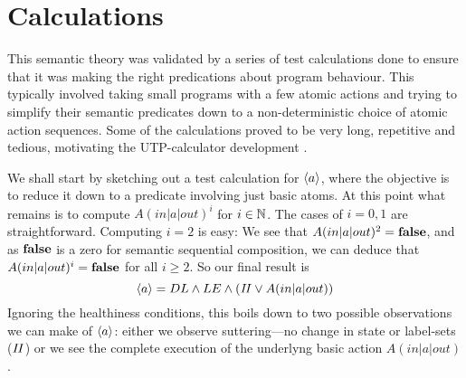 \section{Calculations}\label{sec:calc}

This semantic theory was validated by a series of test calculations
done to ensure that it was making the right predications about program behaviour.
This typically involved taking small programs with a few atomic actions
and trying to simplify their semantic predicates
down to a non-deterministic choice of atomic action sequences.
Some of the calculations proved to be very long,
repetitive and tedious,
motivating the UTP-calculator development \cite{DBLP:conf/utp/Butterfield16}.

We shall start by sketching out a test calculation for $\langle a\rangle$,
where the objective is to reduce it down to a predicate involving
just basic atoms.
At this point what remains is to compute $A(in|a|out)^i$ for $i \in \mathbb{N}$.
The cases of $i=0,1$ are straightforward.
Computing $i=2$ is easy:
We see that $A(in|a|out)^2 = \mathbf{false}$, and as $\mathbf{false}$ is a zero for
semantic sequential composition,
we can deduce that $A(in|a|out)^i = \mathbf{false}$ for all $i \geq 2$.
So our final result is
\begin{equation}
  \langle a\rangle = DL \land LE \land(\mathit{II} \lor A(in|a|out))
\end{equation}
Ignoring the healthiness conditions,
this boils down to two possible observations we can make of $\langle a\rangle$:
either we observe suttering---no change in state or label-sets ($\mathit{II}$)
or we see the complete execution of the underlyng basic action $A(in|a|out)$.

